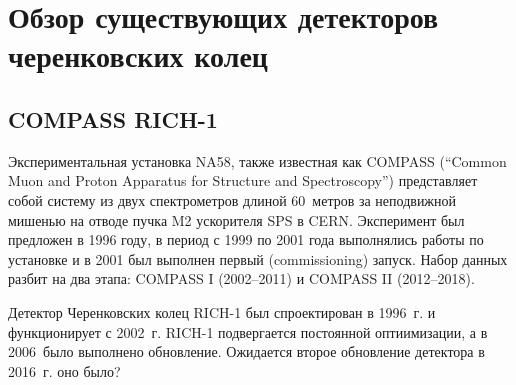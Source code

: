 \section{Обзор существующих детекторов черенковских колец}\label{sec:secRiches}

\subsection{COMPASS RICH-1}\label{sec:CompassRich1}



Экспериментальная установка NA58, также известная как COMPASS (``Common Muon and Proton Apparatus for Structure and Spectroscopy'') представляет собой систему из двух спектрометров длиной 60~метров за неподвижной мишенью на отводе пучка M2 ускорителя SPS в CERN. Эксперимент был предложен в 1996 году, в период с 1999 по 2001 года выполнялись работы по установке и в 2001 был выполнен первый (commissioning) запуск. Набор данных разбит на два этапа: COMPASS I (2002--2011) и COMPASS II (2012--2018). 







Детектор Черенковских колец \mbox{RICH-1} был спроектирован в 1996~г. и функционирует с 2002~г. \mbox{RICH-1} подвергается постоянной оптиимизации, а в 2006~было выполнено обновление. Ожидается второе обновление детектора в 2016~г. \todo оно было?


